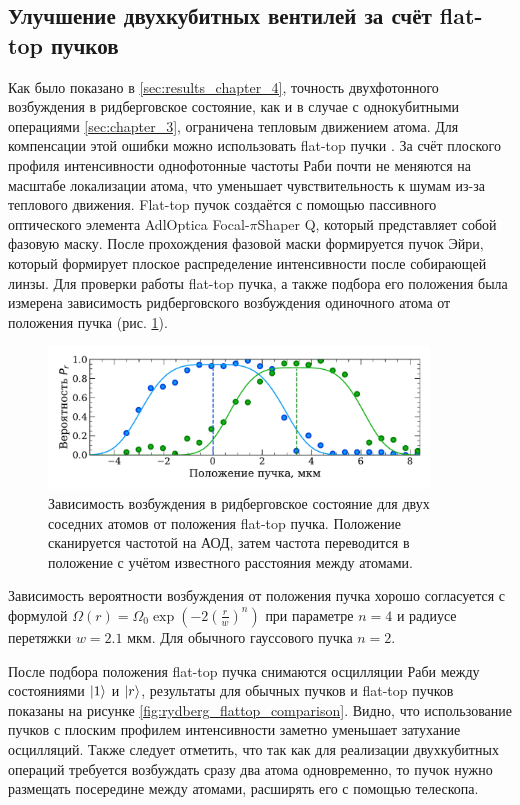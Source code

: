 \subsection{Улучшение двухкубитных вентилей за счёт flat-top пучков}

Как было показано в \ref{sec:results_chapter_4}, точность двухфотонного возбуждения в ридберговское состояние, как и в случае с однокубитными операциями \ref{sec:chapter_3}, ограничена тепловым движением атома. Для компенсации этой ошибки можно использовать flat-top пучки \cite{Gillen_Christandl_2016,Ebadi_2021}. За счёт плоского профиля интенсивности однофотонные частоты Раби почти не меняются на масштабе локализации атома, что уменьшает чувствительность к шумам из-за теплового движения. Flat-top пучок создаётся с помощью пассивного оптического элемента AdlOptica Focal-$\pi$Shaper Q, который представляет собой фазовую маску. После прохождения фазовой маски формируется пучок Эйри, который формирует плоское распределение интенсивности после собирающей линзы. Для проверки работы flat-top пучка, а также подбора его положения была измерена зависимость ридберговского возбуждения одиночного атома от положения пучка (рис. \ref{fig:flattop_scan}).


\begin{figure}[H]
	\centering
	\includegraphics[width=0.9\textwidth]{images/flattop_scan.pdf}
	\caption{Зависимость возбуждения в ридберговское состояние для двух соседних атомов от положения flat-top пучка. Положение сканируется частотой на АОД, затем частота переводится в положение с учётом известного расстояния между атомами.}
	\label{fig:flattop_scan}
\end{figure}

Зависимость вероятности возбуждения от положения пучка хорошо согласуется с формулой $\Omega(r) = \Omega_0 \exp\left(-2\left(\frac{r}{w}\right)^{n}\right)$ \cite{Gillen_Christandl_2016} при параметре $n=4$ и радиусе перетяжки $w = 2.1 \text{ мкм}$. Для обычного гауссового пучка $n=2$. 

После подбора положения flat-top пучка снимаются осцилляции Раби между состояниями $\left| 1 \right\rangle$ и $\left| r \right\rangle$, результаты для обычных пучков и flat-top пучков показаны на рисунке \ref{fig:rydberg_flattop_comparison}. Видно, что использование пучков с плоским профилем интенсивности заметно уменьшает затухание осцилляций. Также следует отметить, что так как для реализации двухкубитных операций требуется возбуждать сразу два атома одновременно, то пучок нужно размещать посередине между атомами, расширять его с помощью телескопа.


